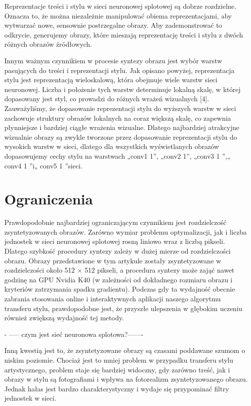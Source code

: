 \documentclass[brudnopis]{xmgr}
\begin{document}
Reprezentacje treści i stylu w sieci neuronowej splotowej są dobrze rozdzielne. Oznacza to, że można niezależnie manipulować obiema reprezentacjami, aby wytwarzać nowe, sensownie postrzegalne obrazy. Aby zademonstrować to odkrycie, generujemy obrazy, które mieszają reprezentację treści i stylu z dwóch różnych obrazów źródłowych.

Innym ważnym czynnikiem w procesie syntezy obrazu jest wybór warstw pasujących do treści i reprezentacji stylu. Jak opisano powyżej, reprezentacja stylu jest reprezentacją wieloskalową, która obejmuje wiele warstw sieci neuronowej. Liczba i położenie tych warstw determinuje lokalną skalę, w której dopasowany jest styl, co prowadzi do różnych wrażeń wizualnych [4]. Zauważyliśmy, że dopasowanie reprezentacji stylu do wyższych warstw w sieci zachowuje struktury obrazów lokalnych na coraz większą skalę, co zapewnia płynniejsze i bardziej ciągłe wrażenia wizualne. Dlatego najbardziej atrakcyjne wizualnie obrazy są zwykle tworzone przez dopasowanie reprezentacji stylu do wysokich warstw w sieci, dlatego dla wszystkich wyświetlanych obrazów dopasowujemy cechy stylu na warstwach „conv1 1”, „conv2 1”, „conv3 1 ”,„ conv4 1 ”i„ conv5 1 ”sieci.

						
\section{Ograniczenia\label{s:dsssl}}

Prawdopodobnie najbardziej ograniczającym czynnikiem jest rozdzielczość zsyntetyzowanych obrazów. Zarówno wymiar problemu optymalizacji, jak i liczba jednostek w sieci neuronowej splotowej rosną liniowo wraz z liczbą pikseli. Dlatego szybkość procedury syntezy zależy w dużej mierze od rozdzielczości obrazu. Obrazy przedstawione w tym artykule zostały zsyntetyzowane w rozdzielczości około 512 × 512 pikseli, a procedura syntezy może zająć nawet godzinę na GPU Nvidia K40 (w zależności od dokładnego rozmiaru obrazu i kryteriów zatrzymania spadku gradientu). Podczas gdy ta wydajność obecnie zabrania stosowania online i interaktywnych aplikacji naszego algorytmu transferu stylu, prawdopodobne jest, że przyszłe ulepszenia w głębokim uczeniu również zwiększą wydajność tej metody.

- ----- czym jest sieć neuronowa splotowa?-------

Inną kwestią jest to, że zsyntetyzowane obrazy są czasami poddawane szumom o niskim poziomie. Chociaż jest to mniej problem w przypadku transferu stylu artystycznego, problem staje się bardziej widoczny, gdy zarówno treść, jak i obrazy w stylu są fotografiami i wpływa na fotorealizm zsyntetyzowanego obrazu. Jednak hałas jest bardzo charakterystyczny i wydaje się przypominać filtry jednostek w sieci. 
\end{document}
